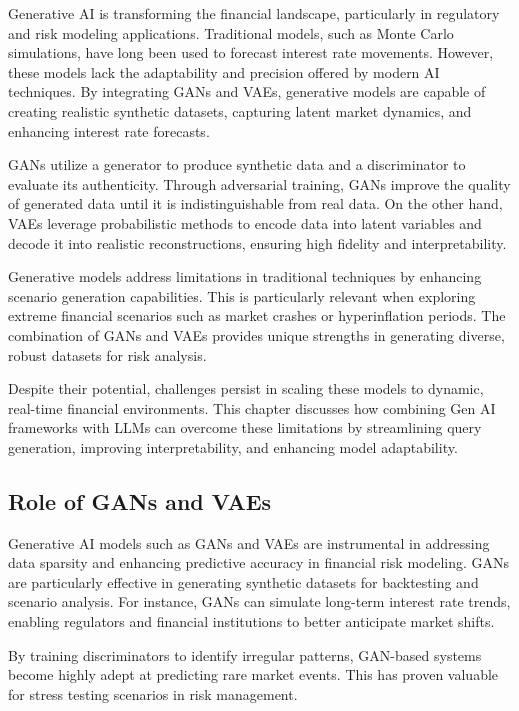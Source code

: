 \documentclass[a4paper,headinclude=on,footinclude=on,12pt,oneside]{scrbook}
\begin{document}
	
	Generative AI is transforming the financial landscape, particularly in regulatory and risk modeling applications. Traditional models, such as Monte Carlo simulations, have long been used to forecast interest rate movements. However, these models lack the adaptability and precision offered by modern AI techniques. By integrating GANs and VAEs, generative models are capable of creating realistic synthetic datasets, capturing latent market dynamics, and enhancing interest rate forecasts.
	
	GANs utilize a generator to produce synthetic data and a discriminator to evaluate its authenticity. Through adversarial training, GANs improve the quality of generated data until it is indistinguishable from real data. On the other hand, VAEs leverage probabilistic methods to encode data into latent variables and decode it into realistic reconstructions, ensuring high fidelity and interpretability.
	
	Generative models address limitations in traditional techniques by enhancing scenario generation capabilities. This is particularly relevant when exploring extreme financial scenarios such as market crashes or hyperinflation periods. The combination of GANs and VAEs provides unique strengths in generating diverse, robust datasets for risk analysis.
	
	Despite their potential, challenges persist in scaling these models to dynamic, real-time financial environments. This chapter discusses how combining Gen AI frameworks with LLMs can overcome these limitations by streamlining query generation, improving interpretability, and enhancing model adaptability.
	
	
	\subsection{Role of GANs and VAEs}
	
	Generative AI models such as GANs and VAEs are instrumental in addressing data sparsity and enhancing predictive accuracy in financial risk modeling. GANs are particularly effective in generating synthetic datasets for backtesting and scenario analysis. For instance, GANs can simulate long-term interest rate trends, enabling regulators and financial institutions to better anticipate market shifts.
	
	By training discriminators to identify irregular patterns, GAN-based systems become highly adept at predicting rare market events. This has proven valuable for stress testing scenarios in risk management.
	
\end{document}
